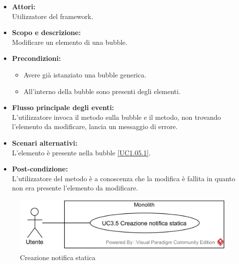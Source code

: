 \begin{itemize}
	\item \textbf{Attori:}
	\\Utilizzatore del framework.
	\item \textbf{Scopo e descrizione:} 
	\\Modificare un elemento di una bubble.
	\item \textbf{Precondizioni:}
	\begin{itemize}
		\item Avere già istanziato una bubble generica.
		\item All'interno della bubble sono presenti degli elementi.
	\end{itemize}
	\item \textbf{Flusso principale degli eventi:}
	\\L'utilizzatore invoca il metodo sulla bubble e il metodo, non trovando l'elemento da modificare, lancia un messaggio di errore.
	\item \textbf{Scenari alternativi:}
	\\L'elemento è presente nella bubble \ref{UC1.05.1}.
	\item \textbf{Post-condizione:}
	\\L'utilizzatore del metodo è a conoscenza che la modifica è fallita in quanto non era presente l'elemento da modificare.
\end{itemize}

\begin{samepage}
\nopagebreak
\begin{figure}[H]
	\centering
	\includegraphics[width=15cm]{../../documenti/AnalisiDeiRequisiti/Diagrammi_img/usecase/uc1_17.png}
	\caption{\UCFCaption{} Creazione notifica statica}
\end{figure}
\end{samepage}

